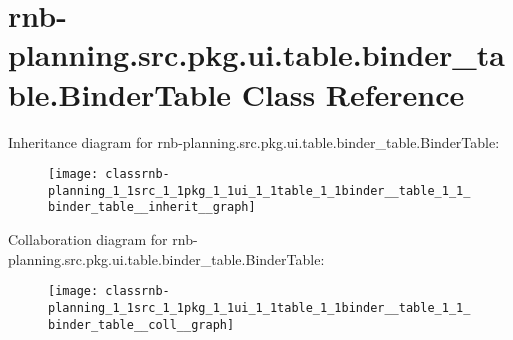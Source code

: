 \hypertarget{classrnb-planning_1_1src_1_1pkg_1_1ui_1_1table_1_1binder__table_1_1_binder_table}{}\section{rnb-\/planning.src.\+pkg.\+ui.\+table.\+binder\+\_\+table.\+Binder\+Table Class Reference}
\label{classrnb-planning_1_1src_1_1pkg_1_1ui_1_1table_1_1binder__table_1_1_binder_table}


Inheritance diagram for rnb-\/planning.src.\+pkg.\+ui.\+table.\+binder\+\_\+table.\+Binder\+Table\+:\nopagebreak
\begin{figure}[H]
\begin{center}
\leavevmode
\texttt{[image: classrnb-planning\_1\_1src\_1\_1pkg\_1\_1ui\_1\_1table\_1\_1binder\_\_table\_1\_1\_binder\_table\_\_inherit\_\_graph]}
\end{center}
\end{figure}


Collaboration diagram for rnb-\/planning.src.\+pkg.\+ui.\+table.\+binder\+\_\+table.\+Binder\+Table\+:\nopagebreak
\begin{figure}[H]
\begin{center}
\leavevmode
\texttt{[image: classrnb-planning\_1\_1src\_1\_1pkg\_1\_1ui\_1\_1table\_1\_1binder\_\_table\_1\_1\_binder\_table\_\_coll\_\_graph]}
\end{center}
\end{figure}
